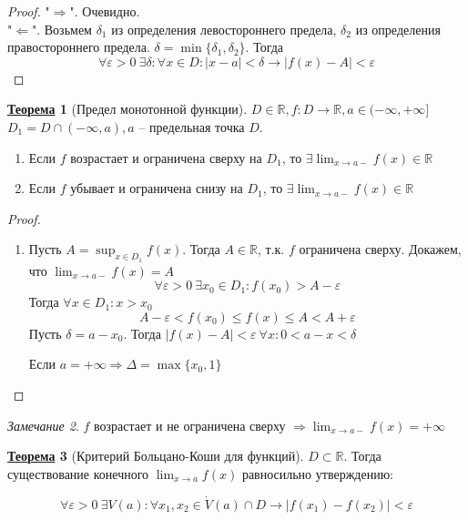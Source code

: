 \documentclass[12pt]{article}
\newenvironment{MyList}[1][4pt]{
  \begin{enumerate}[1.]
  \setlength{\parskip}{0pt}
  \setlength{\itemsep}{#1}
}{       
  \end{enumerate}
}
\def\R{\mathbb{R}}       %
\def\SO{\Rightarrow}     %
\theoremstyle{definition} %
\newtheorem{Thm}{\underline{Теорема}}[subsection] %
\theoremstyle{plain} %
\theoremstyle{remark} %
\newtheorem{Rem}[Thm]{Замечание} %
\begin{document}
\begin{proof}
    "$\SO$". Очевидно. \\
    "$\Leftarrow$". Возьмем $\delta_1$ из определения левостороннего предела, $\delta_2$ из определения правостороннего предела.
    $\delta = \min \{\delta_1, \delta_2\}$. Тогда 
    \[\forall \varepsilon > 0 \ \exists \delta : \forall x \in D : |x - a| < \delta \to |f(x) - A| < \varepsilon\]  
\end{proof}

\begin{Thm}[Предел монотонной функции]
    $D \in \R, f : D \to \R, a \in (-\infty, +\infty]$ \\
    $D_1 = D \cap (-\infty, a), a$ -- предельная точка $D$.
    \begin{MyList}
        \item Если $f$ возрастает и ограничена сверху на $D_1$, то $\exists \lim_{x \to a-} f(x) \in \R$
        \item Если $f$ убывает и ограничена снизу на $D_1$, то $\exists \lim_{x \to a-} f(x) \in \R$  
    \end{MyList} 
\end{Thm}

\begin{proof}
    \begin{MyList}
        \item Пусть $A = \sup_{x \in D_1} f(x)$. Тогда $A \in \R$, т.к. $f$ ограничена сверху. Докажем, что $\lim_{x \to a-} f(x) = A$
        \[\forall \varepsilon > 0 \ \exists x_0 \in D_1 : f(x_0) > A - \varepsilon\]
        Тогда $\forall x \in D_1 : x > x_0$
        \[A - \varepsilon < f(x_0) \leqslant f(x) \leqslant A < A + \varepsilon\]
        Пусть $\delta = a - x_0$. Тогда $|f(x) - A| < \varepsilon \ \forall x : 0 < a - x < \delta$
        
        Если $a = +\infty \SO \Delta = \max \{x_0, 1\}$ 
    \end{MyList}
\end{proof}

\begin{Rem}
    $f$ возрастает и не ограничена сверху $\SO \lim_{x \to a-} f(x) = +\infty$ 
\end{Rem}

\begin{Thm}[Критерий Больцано-Коши для функций]
    $D \subset \R$. Тогда существование конечного $\lim_{x \to a} f(x)$ равносильно утверждению:
    
    \[\forall \varepsilon > 0 \ \exists V(a) : \forall x_1, x_2 \in \dot{V}(a) \cap D \to |f(x_1) - f(x_2)| < \varepsilon\]
\end{Thm}
\end{document}
